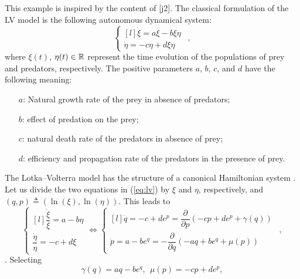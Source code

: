 %
%
\begin{exmp}
	This example is inspired by the content of [j2].
    The classical formulation of the LV model is the following autonomous dynamical system:
    \begin{equation}\label{eq:lv}
        \left\{ 
            \begin{matrix*}[l]
                \dot{\xi} = a\xi - b\xi\eta\\
                \dot{\eta} = -c\eta + d\xi\eta
            \end{matrix*}\right.~~,
    \end{equation}
    where $\xi(t)$, $\eta(t)\in\mathbb{R}$ represent the time evolution of the populations of prey and predators, respectively. The positive parameters $a$, $b$, $c$, and $d$ have the following meaning:
    \begin{itemize}
        \item [$a$:] Natural growth rate of the prey in absence of predators;
        \item [$b$:] effect of predation on the prey;
        \item [$c$:] natural death rate of the predators in absence of prey;
        \item [$d$:] efficiency and propagation rate of the predators in the presence of prey.
    \end{itemize}
    The Lotka--Volterra model has the structure of a canonical Hamiltonian system \citep{vulpiani2010chaos}. 
    Let us divide the two equations in (\ref{eq:lv}) by $\xi$ and $\eta$, respectively, and $(q,p)\triangleq(\ln(\xi),\ln(\eta))$. This leads to
	\begin{equation*}
	    \left\{ 
	        \begin{matrix*}[l]
	            \dfrac{\dot{\xi}}{\xi} = a - b\eta\\
	            \dfrac{\dot{\eta}}{\eta} = -c + d\xi
	        \end{matrix*}\right.
    \Leftrightarrow
    \left\{ 
	\begin{matrix*}[l]
	\dot{q} = -c + de^p = \dfrac{\partial}{\partial p}(-cp+de^p + \gamma(q))\\
	\dot{p} = a - be^q = -\dfrac{\partial}{\partial q}(-aq+be^q + \mu(p))
	\end{matrix*}\right.~~,
	\end{equation*}
	. Selecting 
	\begin{equation}
	    \gamma(q) = aq-be^q,~~ \mu(p) = -cp+de^p ,

\end{equation}
\end{exmp}
